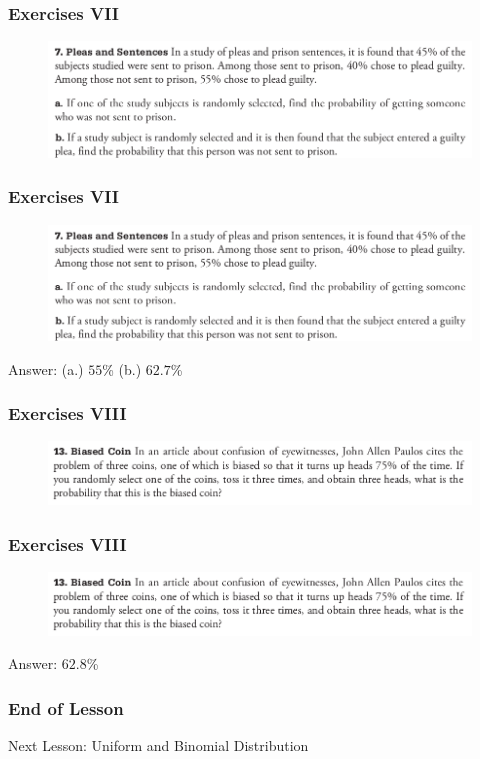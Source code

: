 \documentclass[xcolor=dvipsnames]{beamer}
\begin{document}
\begin{frame}
  \frametitle{Exercises VII}
\begin{figure}[h]
\includegraphics[scale=.36]{./diagrams/triola_bayes2.png}
\end{figure}
\end{frame}

\begin{frame}
  \frametitle{Exercises VII}
\begin{figure}[h]
\includegraphics[scale=.36]{./diagrams/triola_bayes2.png}
\end{figure}
Answer: (a.) $55$\% (b.) $62.7$\%
\end{frame}

\begin{frame}
  \frametitle{Exercises VIII}
\begin{figure}[h]
\includegraphics[scale=.36]{./diagrams/triola_bayes3.png}
\end{figure}
\end{frame}

\begin{frame}
  \frametitle{Exercises VIII}
\begin{figure}[h]
\includegraphics[scale=.36]{./diagrams/triola_bayes3.png}
\end{figure}
Answer: $62.8$\%
\end{frame}

\begin{frame}
  \frametitle{End of Lesson}
Next Lesson: Uniform and Binomial Distribution
\end{frame}
\end{document}
